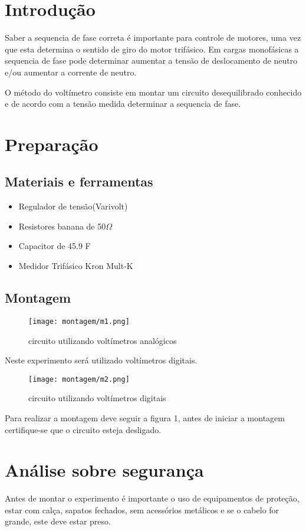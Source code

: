 \documentclass[a4paper, 12pt]{article}
\begin{document}
		\section{Introdução}
		Saber a sequencia de fase correta é importante para controle de motores, uma vez que esta determina o sentido de giro do motor trifásico. Em cargas monofásicas a sequencia de fase pode determinar aumentar a tensão de deslocamento de neutro e/ou aumentar a corrente de neutro.

		O método do voltímetro consiste em montar um circuito desequilibrado conhecido e de acordo com a tensão medida determinar a sequencia de fase.
		\section{Preparação}
		\subsection{Materiais e ferramentas}
			\begin{itemize}
				\item Regulador de tensão(Varivolt)
				\item Resistores banana de 50\(\Omega\)
				\item Capacitor de 45.9 \si{\micro}F
				\item Medidor Trifásico Kron Mult-K
			\end{itemize}
			\subsection{Montagem}
			\begin{figure}[H]
				\centering %
				\texttt{[image: montagem/m1.png]}
				\caption{circuito utilizando voltímetros analógicos}
			\end{figure}
			Neste experimento será utilizado voltímetros digitais.
			\begin{figure}[H]
				\centering %
				\texttt{[image: montagem/m2.png]}
				\caption{circuito utilizando voltímetros digitais}
			\end{figure}
			Para realizar a montagem deve seguir a figura 1, antes de iniciar a montagem certifique-se que o circuito esteja desligado.

			\section{Análise sobre segurança}
		\justifying
		Antes de montar o experimento é importante o uso de equipamentos de proteção, estar com calça, sapatos fechados, sem acessórios metálicos e se o cabelo for grande, este deve estar preso.
\end{document}
